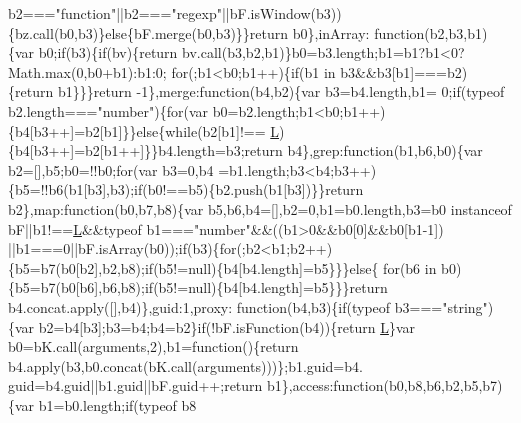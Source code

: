 \begin{DoxyCode}
      b2===\textcolor{stringliteral}{"function"}||b2===\textcolor{stringliteral}{"regexp"}||bF.isWindow(b3))\{bz.call(b0,b3)\}\textcolor{keywordflow}{else}\{bF.merge(b0,b3)\}\}\textcolor{keywordflow}{return} b0\},inArray:\textcolor{keyword}{
      function}(b2,b3,b1)\{var b0;\textcolor{keywordflow}{if}(b3)\{\textcolor{keywordflow}{if}(bv)\{\textcolor{keywordflow}{return} bv.call(b3,b2,b1)\}b0=b3.length;b1=b1?b1<0?Math.max(0,b0+b1):b1:0;\textcolor{keywordflow}{
      for}(;b1<b0;b1++)\{\textcolor{keywordflow}{if}(b1 in b3&&b3[b1]===b2)\{\textcolor{keywordflow}{return} b1\}\}\}\textcolor{keywordflow}{return} -1\},merge:\textcolor{keyword}{function}(b4,b2)\{var b3=b4.length,b1=
      0;\textcolor{keywordflow}{if}(typeof b2.length===\textcolor{stringliteral}{"number"})\{\textcolor{keywordflow}{for}(var b0=b2.length;b1<b0;b1++)\{b4[b3++]=b2[b1]\}\}\textcolor{keywordflow}{else}\{\textcolor{keywordflow}{while}(b2[b1]!==
      \hyperlink{a00039_a38ee4c0b5f4fe2a18d0c783af540d253}{L})\{b4[b3++]=b2[b1++]\}\}b4.length=b3;\textcolor{keywordflow}{return} b4\},grep:\textcolor{keyword}{function}(b1,b6,b0)\{var b2=[],b5;b0=!!b0;\textcolor{keywordflow}{for}(var b3=0,b4
      =b1.length;b3<b4;b3++)\{b5=!!b6(b1[b3],b3);\textcolor{keywordflow}{if}(b0!==b5)\{b2.push(b1[b3])\}\}\textcolor{keywordflow}{return} b2\},map:\textcolor{keyword}{function}(b0,b7,b8)\{var
       b5,b6,b4=[],b2=0,b1=b0.length,b3=b0 instanceof bF||b1!==\hyperlink{a00039_a38ee4c0b5f4fe2a18d0c783af540d253}{L}&&typeof b1===\textcolor{stringliteral}{"number"}&&((b1>0&&b0[0]&&b0[b1-1])
      ||b1===0||bF.isArray(b0));\textcolor{keywordflow}{if}(b3)\{\textcolor{keywordflow}{for}(;b2<b1;b2++)\{b5=b7(b0[b2],b2,b8);\textcolor{keywordflow}{if}(b5!=null)\{b4[b4.length]=b5\}\}\}\textcolor{keywordflow}{else}\{\textcolor{keywordflow}{
      for}(b6 in b0)\{b5=b7(b0[b6],b6,b8);\textcolor{keywordflow}{if}(b5!=null)\{b4[b4.length]=b5\}\}\}\textcolor{keywordflow}{return} b4.concat.apply([],b4)\},guid:1,proxy:\textcolor{keyword}{
      function}(b4,b3)\{\textcolor{keywordflow}{if}(typeof b3===\textcolor{stringliteral}{"string"})\{var b2=b4[b3];b3=b4;b4=b2\}\textcolor{keywordflow}{if}(!bF.isFunction(b4))\{\textcolor{keywordflow}{return} 
      \hyperlink{a00039_a38ee4c0b5f4fe2a18d0c783af540d253}{L}\}var b0=bK.call(arguments,2),b1=\textcolor{keyword}{function}()\{\textcolor{keywordflow}{return} b4.apply(b3,b0.concat(bK.call(arguments)))\};b1.guid=b4.
      guid=b4.guid||b1.guid||bF.guid++;\textcolor{keywordflow}{return} b1\},access:\textcolor{keyword}{function}(b0,b8,b6,b2,b5,b7)\{var b1=b0.length;\textcolor{keywordflow}{if}(typeof b8

\end{DoxyCode}
